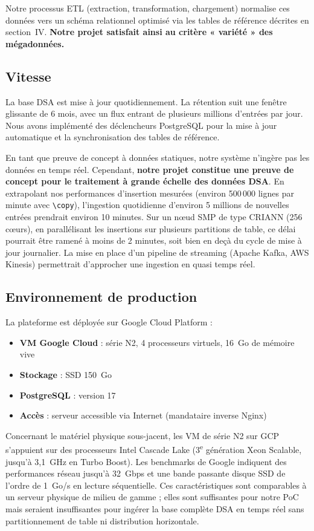 \documentclass[10pt,twocolumn,a4paper]{article}
\begin{document}
Notre processus ETL (extraction, transformation, chargement) normalise ces données vers un schéma relationnel optimisé via les tables de référence décrites en section~IV. \textbf{Notre projet satisfait ainsi au critère « variété » des mégadonnées.}

\subsection{Vitesse}

La base DSA est mise à jour quotidiennement. La rétention suit une fenêtre glissante de 6 mois, avec un flux entrant de plusieurs millions d'entrées par jour. Nous avons implémenté des déclencheurs PostgreSQL pour la mise à jour automatique et la synchronisation des tables de référence.

En tant que preuve de concept à données statiques, notre système n'ingère pas les données en temps réel. Cependant, \textbf{notre projet constitue une preuve de concept pour le traitement à grande échelle des données DSA}. En extrapolant nos performances d'insertion mesurées (environ 500\,000 lignes par minute avec \texttt{\textbackslash copy}), l'ingestion quotidienne d'environ 5 millions de nouvelles entrées prendrait environ 10 minutes. Sur un nœud SMP de type CRIANN (256 cœurs), en parallélisant les insertions sur plusieurs partitions de table, ce délai pourrait être ramené à moins de 2 minutes, soit bien en deçà du cycle de mise à jour journalier. La mise en place d'un pipeline de streaming (Apache Kafka, AWS Kinesis) permettrait d'approcher une ingestion en quasi temps réel.

\subsection{Environnement de production}

La plateforme est déployée sur Google Cloud Platform :

\begin{itemize}
    \item \textbf{VM Google Cloud} : série N2, 4 processeurs virtuels, 16~Go de mémoire vive
    \item \textbf{Stockage} : SSD 150~Go
    \item \textbf{PostgreSQL} : version 17
    \item \textbf{Accès} : serveur accessible via Internet (mandataire inverse Nginx)
\end{itemize}

Concernant le matériel physique sous-jacent, les VM de série N2 sur GCP s'appuient sur des processeurs Intel Cascade Lake (3\textsuperscript{e} génération Xeon Scalable, jusqu'à 3,1~GHz en Turbo Boost). Les benchmarks de Google indiquent des performances réseau jusqu'à 32~Gbps et une bande passante disque SSD de l'ordre de 1~Go/s en lecture séquentielle. Ces caractéristiques sont comparables à un serveur physique de milieu de gamme ; elles sont suffisantes pour notre PoC mais seraient insuffisantes pour ingérer la base complète DSA en temps réel sans partitionnement de table ni distribution horizontale.
\end{document}
